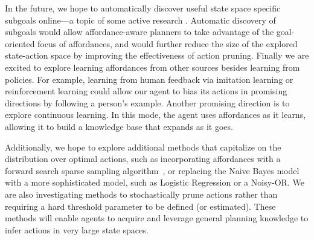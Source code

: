 \documentclass[letterpaper]{article}
\begin{document}
In the future, we hope to automatically discover useful state space
specific subgoals online---a topic of some active research
\cite{Mcgovern01automaticdiscovery,Simsek:2005:IUS:1102351.1102454}.
Automatic discovery of subgoals would allow affordance-aware planners
to take advantage of the goal-oriented focus of affordances, and would
further reduce the size of the explored state-action space by
improving the effectiveness of action pruning. Finally we are excited
to explore learning affordances from other sources besides learning
from policies.  For example, learning from human feedback via
imitation learning or reinforcement learning could allow our agent to
bias its actions in promising directions by following a person's
example.  Another promising direction is to explore continuous
learning.  In this mode, the agent uses affordances as it learns,
allowing it to build a knowledge base that expands as it goes.

Additionally, we hope to explore additional methods that capitalize on
the distribution over optimal actions, such as incorporating
affordances with a forward search sparse sampling
algorithm~\cite{walsh2010integrating}, or replacing the Naive Bayes
model with a more sophisticated model, such as Logistic Regression or
a Noisy-OR.  We are also investigating methods to stochastically prune
actions rather than requiring a hard threshold parameter to be defined
(or estimated).  These methods will enable agents to acquire and
leverage general planning knowledge to infer actions in very large
state spaces.



{\small


}
\end{document}
